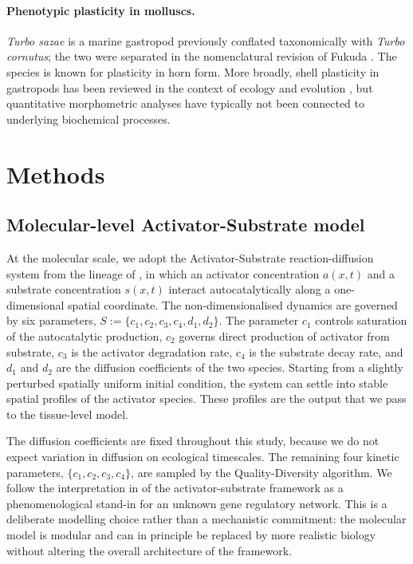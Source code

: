 \documentclass[11pt]{article}
\begin{document}
\paragraph{Phenotypic plasticity in molluscs.} \textit{Turbo sazae} is a
marine gastropod previously conflated taxonomically with \textit{Turbo
cornutus}; the two were separated in the nomenclatural revision of Fukuda
\citep{fukuda2017nomenclature}. The species is known for plasticity in
horn form. More broadly, shell plasticity in gastropods has been reviewed
in the context of ecology and evolution
\citep{tanaka2018phenotypic,hamm2008environmental}, but quantitative
morphometric analyses have typically not been connected to underlying
biochemical processes.

\section{Methods}
\label{sec:methods}

\subsection{Molecular-level Activator-Substrate model}

At the molecular scale, we adopt the Activator-Substrate reaction-diffusion
system from the lineage of \citet{fowler1992modeling}, in which an
activator concentration $a(x,t)$ and a substrate concentration $s(x,t)$
interact autocatalytically along a one-dimensional spatial coordinate.
The non-dimensionalised dynamics are governed by six parameters,
$S := \{c_1, c_2, c_3, c_4, d_1, d_2\}$. The parameter $c_1$ controls
saturation of the autocatalytic production, $c_2$ governs direct production
of activator from substrate, $c_3$ is the activator degradation rate, $c_4$
is the substrate decay rate, and $d_1$ and $d_2$ are the diffusion
coefficients of the two species. Starting from a slightly perturbed
spatially uniform initial condition, the system can settle into stable
spatial profiles of the activator species. These profiles are the output
that we pass to the tissue-level model.

The diffusion coefficients are fixed throughout this study, because we do
not expect variation in diffusion on ecological timescales. The remaining
four kinetic parameters, $\{c_1, c_2, c_3, c_4\}$, are sampled by the
Quality-Diversity algorithm. We follow the interpretation in
\citet{meinhardt1987model} of the activator-substrate framework as a
phenomenological stand-in for an unknown gene regulatory network. This is
a deliberate modelling choice rather than a mechanistic commitment: the
molecular model is modular and can in principle be replaced by more
realistic biology without altering the overall architecture of the
framework.
\end{document}
